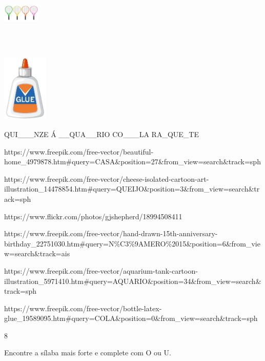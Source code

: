 {\includegraphics[width=0.70192in,height=1.39623in]{media/image32.jpeg}

\includegraphics[width=0.85819in,height=1.27885in]{media/image33.jpeg}

QUI\_\_\_NZE Á \_\_QUA\_\_RIO CO\_\_\_LA RA\_QUE\_TE

https://www.freepik.com/free-vector/beautiful-home\_4979878.htm\#query=CASA\&position=27\&from\_view=search\&track=sph

https://www.freepik.com/free-vector/cheese-isolated-cartoon-art-illustration\_14478854.htm\#query=QUEIJO\&position=3\&from\_view=search\&track=sph

https://www.flickr.com/photos/gjshepherd/18994508411

https://www.freepik.com/free-vector/hand-drawn-15th-anniversary-birthday\_22751030.htm\#query=N\%C3\%9AMERO\%2015\&position=6\&from\_view=search\&track=ais

https://www.freepik.com/free-vector/aquarium-tank-cartoon-illustration\_5971410.htm\#query=AQUARIO\&position=34\&from\_view=search\&track=sph

https://www.freepik.com/free-vector/bottle-latex-glue\_19589095.htm\#query=COLA\&position=0\&from\_view=search\&track=sph

\num{8}

Encontre a sílaba mais forte e complete com O ou U.


}
